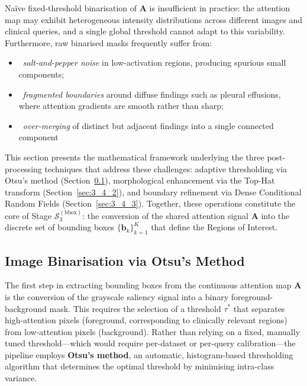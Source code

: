 Na\"ive fixed-threshold binarisation of $\mathbf{A}$ is insufficient in practice: the attention map may exhibit heterogeneous intensity distributions across different images and clinical queries, and a single global threshold cannot adapt to this variability. Furthermore, raw binarised masks frequently suffer from:

\begin{itemize}
  \item ~\textit{salt-and-pepper noise} in low-activation regions, producing spurious small components;
  \item ~\textit{fragmented boundaries} around diffuse findings such as pleural effusions, where attention gradients are smooth rather than sharp;
  \item ~\textit{over-merging} of distinct but adjacent findings into a single connected component
\end{itemize}


This section presents the mathematical framework underlying the three post-processing techniques that address these challenges: adaptive thresholding via Otsu's method (Section~\ref{sec:3_4_1}), morphological enhancement via the Top-Hat transform (Section~\ref{sec:3_4_2}), and boundary refinement via Dense Conditional Random Fields (Section~\ref{sec:3_4_3}). Together, these operations constitute the core of Stage $\mathcal{S}_3^{(\text{bbox})}$: the conversion of the shared attention signal $\mathbf{A}$ into the discrete set of bounding boxes $\{\mathbf{b}_k\}_{k=1}^{K}$ that define the Regions of Interest.

\subsection{Image Binarisation via Otsu's Method}
\label{sec:3_4_1}

The first step in extracting bounding boxes from the continuous attention map $\mathbf{A}$ is the conversion of the grayscale saliency signal into a binary foreground-background mask. This requires the selection of a threshold $\tau^{*}$ that separates high-attention pixels (foreground, corresponding to clinically relevant regions) from low-attention pixels (background). Rather than relying on a fixed, manually tuned threshold---which would require per-dataset or per-query calibration---the pipeline employs \textbf{Otsu's method}, an automatic, histogram-based thresholding algorithm that determines the optimal threshold by minimising intra-class variance.

